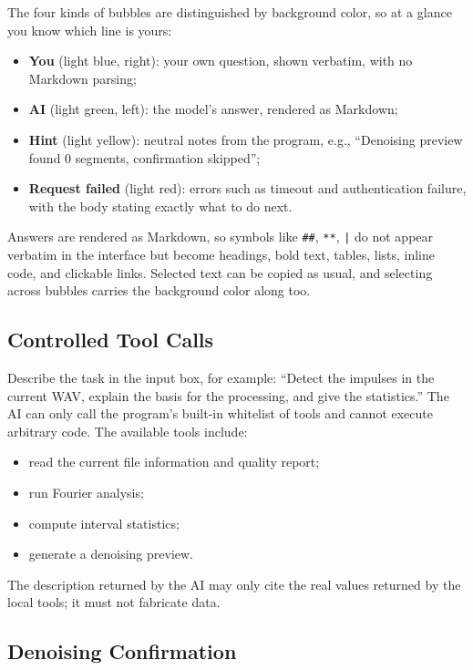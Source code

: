 \documentclass[UTF8,a4paper,12pt]{ctexart}
\begin{document}
The four kinds of bubbles are distinguished by background color, so at a glance you know which line is yours:

\begin{itemize}
  \item \textbf{You} (light blue, right): your own question, shown verbatim, with no Markdown parsing;
  \item \textbf{AI} (light green, left): the model's answer, rendered as Markdown;
  \item \textbf{Hint} (light yellow): neutral notes from the program, e.g., ``Denoising preview found 0 segments, confirmation skipped'';
  \item \textbf{Request failed} (light red): errors such as timeout and authentication failure, with the body stating exactly what to do next.
\end{itemize}

Answers are rendered as Markdown, so symbols like \texttt{\#\#}, \texttt{**}, \texttt{|} do not appear verbatim in the interface but become headings, bold text, tables, lists, inline code, and clickable links. Selected text can be copied as usual, and selecting across bubbles carries the background color along too.

\subsection{Controlled Tool Calls}

Describe the task in the input box, for example: ``Detect the impulses in the current WAV, explain the basis for the processing, and give the statistics.'' The AI can only call the program's built-in whitelist of tools and cannot execute arbitrary code. The available tools include:

\begin{itemize}
  \item read the current file information and quality report;
  \item run Fourier analysis;
  \item compute interval statistics;
  \item generate a denoising preview.
\end{itemize}

The description returned by the AI may only cite the real values returned by the local tools; it must not fabricate data.

\subsection{Denoising Confirmation}
\end{document}
